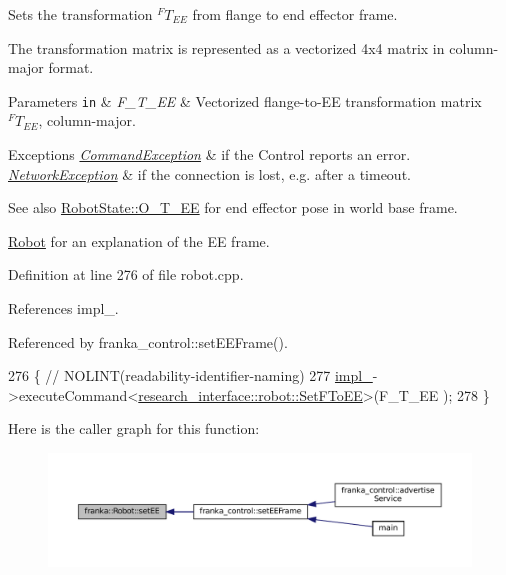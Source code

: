Sets the transformation $^FT_{EE}$ from flange to end effector frame.

The transformation matrix is represented as a vectorized 4x4 matrix in column-\/major format.


\begin{DoxyParams}[1]{Parameters}
\mbox{\tt in}  & {\em F\+\_\+\+T\+\_\+\+EE} & Vectorized flange-\/to-\/\+EE transformation matrix $^FT_{EE}$, column-\/major.\\
\hline
\end{DoxyParams}

\begin{DoxyExceptions}{Exceptions}
{\em \hyperlink{structfranka_1_1CommandException}{Command\+Exception}} & if the Control reports an error. \\
\hline
{\em \hyperlink{structfranka_1_1NetworkException}{Network\+Exception}} & if the connection is lost, e.\+g. after a timeout.\\
\hline
\end{DoxyExceptions}
\begin{DoxySeeAlso}{See also}
\hyperlink{structfranka_1_1RobotState_a193781d47722b32925e0ea7ac415f442}{Robot\+State\+::\+O\+\_\+\+T\+\_\+\+EE} for end effector pose in world base frame. 

\hyperlink{classfranka_1_1Robot}{Robot} for an explanation of the EE frame. 
\end{DoxySeeAlso}


Definition at line 276 of file robot.\+cpp.



References impl\+\_\+.



Referenced by franka\+\_\+control\+::set\+E\+E\+Frame().


\begin{DoxyCode}
276                                                     \{  \textcolor{comment}{// NOLINT(readability-identifier-naming)}
277   \hyperlink{classfranka_1_1Robot_aca155054184e5b6478942fd6a1b82ba4}{impl\_}->executeCommand<\hyperlink{structresearch__interface_1_1robot_1_1SetFToEE}{research\_interface::robot::SetFToEE}>(F\_T\_EE
      );
278 \}
\end{DoxyCode}
Here is the caller graph for this function\+:
\nopagebreak
\begin{figure}[H]
\begin{center}
\leavevmode
\includegraphics[width=350pt]{classfranka_1_1Robot_a5043fca4c35f63b492d9e67c74ddc73b_icgraph}
\end{center}
\end{figure}
\mbox{\label{classfranka_1_1Robot_aebce1a0dbe3b139bb24001845b2afe07}} 
